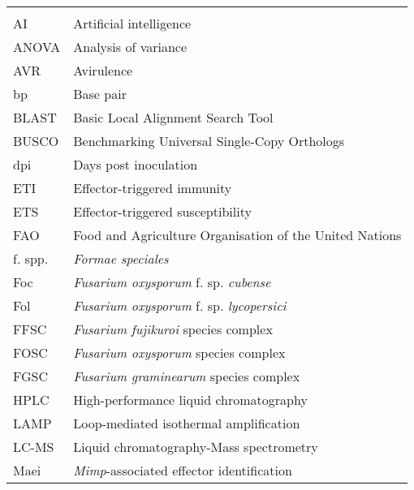 \begin{longtable}{ll}
\captionsetup[]{list=no}
\label{tab:my-table}\\
AI       & Artificial   intelligence                                 \\
\endfirsthead
%
\endhead
%
ANOVA    & Analysis of   variance                                    \\
AVR      & Avirulence                                                \\
bp       & Base pair                                                 \\
BLAST    & Basic Local   Alignment Search Tool                       \\
BUSCO    & Benchmarking   Universal Single-Copy Orthologs            \\
dpi      & Days post inoculation                                     \\
ETI      & Effector-triggered   immunity                             \\
ETS      & Effector-triggered   susceptibility                       \\
FAO      & Food and   Agriculture Organisation of the United Nations \\
f. spp.  & \textit{Formae   speciales}                                        \\
Foc      & \textit{Fusarium oxysporum} f. sp. \textit{cubense}                         \\
Fol      & \textit{Fusarium oxysporum} f. sp.   \textit{lycopersici}                   \\
FFSC     & \textit{Fusarium fujikuroi} species complex                        \\
FOSC     & \textit{Fusarium oxysporum }species complex                        \\
FGSC     & \textit{Fusarium   graminearum }species complex                    \\
HPLC     & High-performance   liquid chromatography                  \\
LAMP     & Loop-mediated   isothermal amplification                  \\
LC-MS    & Liquid   chromatography-Mass spectrometry                 \\
Maei     & \textit{Mimp}-associated   effector identification                 \\

\end{longtable}
